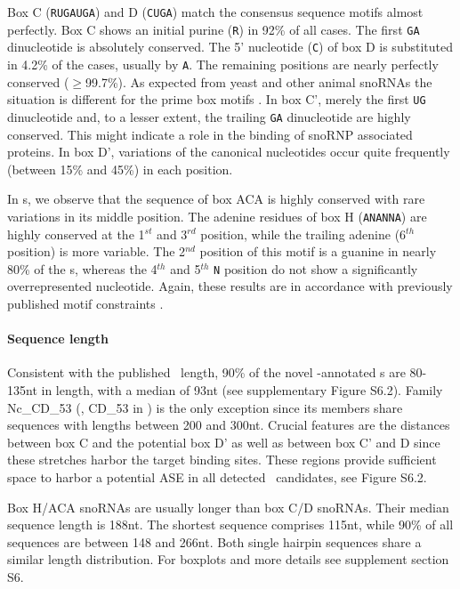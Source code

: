 Box C (\texttt{RUGAUGA}) and D (\texttt{CUGA}) match the consensus
sequence motifs almost perfectly. Box C shows an initial purine
(\texttt{R}) in 92\% of all cases.  The first \texttt{GA} dinucleotide
is absolutely conserved.  The 5' nucleotide (\texttt{C}) of box D is
substituted in 4.2\% of the cases, usually by \texttt{A}. The
remaining positions are nearly perfectly conserved ($\ge$99.7\%). As
expected from yeast and other animal snoRNAs the situation is
different for the prime box motifs \cite{
  Cahill:2002,Kiss-László:1998}.  In box C', merely the first
\texttt{UG} dinucleotide and, to a lesser extent, the trailing
\texttt{GA} dinucleotide are highly conserved.  This might indicate a
role in the binding of snoRNP associated proteins.  In box D',
variations of the canonical nucleotides occur quite frequently
(between 15\% and 45\%) in each position.

In \haca s, we observe that the sequence of box ACA is highly
conserved with rare variations in its middle position. The adenine
residues of box H (\texttt{ANANNA}) are highly conserved at the
1$^{st}$ and 3$^{rd}$ position, while the trailing adenine (6$^{th}$
position) is more variable. The 2$^{nd}$ position of this motif is a
guanine in nearly 80\% of the \haca s, whereas the 4$^{th}$ and
5$^{th}$ \texttt{N} position do not show a significantly
overrepresented nucleotide. Again, these results are in accordance
with previously published motif constraints \cite{Normand:2006}.

\paragraph{\textbf{Sequence length}} Consistent with the published
\cd\ length, 90\% of the novel \snostrip-annotated \sno s are 80-135nt
in length, with a median of 93nt (see supplementary Figure S6.2).
Family Nc\_CD\_53 (\ncr, CD\_53 in \snostrip) is the only exception
since its members share sequences with lengths between 200 and 300nt.
Crucial features are the distances between box C and the potential box
D' as well as between box C' and D since these stretches harbor the
target binding sites. These regions provide sufficient space to harbor
a potential ASE in all detected \sno\ candidates, see Figure S6.2.

Box H/ACA snoRNAs are usually longer than box C/D snoRNAs. Their
median sequence length is 188nt. The shortest sequence comprises
115nt, while 90\% of all sequences are between 148 and 266nt.  Both
single hairpin sequences share a similar length distribution. For
boxplots and more details see supplement section S6.


